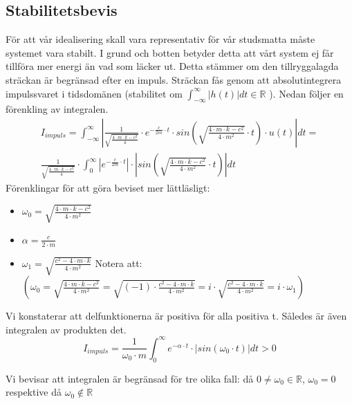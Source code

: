\documentclass[10pt,a4paper]{article}
\begin{document}
\subsection{Stabilitetsbevis}
För att vår idealisering skall vara representativ för vår studsmatta måste systemet vara stabilt. I grund och botten betyder detta att vårt system ej får tillföra mer energi än vad som läcker ut. Detta stämmer om den tillryggalagda sträckan är begränsad efter en impuls. Sträckan fås genom att absolutintegrera impulssvaret i tidsdomänen (stabilitet om $\int_{-\infty}^{\infty}|h(t)|dt\in \mathbb{R}$ ). Nedan följer en förenkling av integralen.
\begin{multline}
I_{impuls}=\int_{-\infty}^{\infty}| \frac{1}{\sqrt{\frac{4 \cdot m \cdot k - c^2}{4}} }  \cdot e^{-\frac{c}{2m} \cdot t} \cdot sin(\sqrt{\frac{4 \cdot m \cdot k - c^2}{4 \cdot m^2}} \cdot t) \cdot u(t)|dt=\\ \frac{1}{\sqrt{\frac{4 \cdot m \cdot k - c^2}{4}} }  \cdot \int_{0}^{\infty}|e^{-\frac{c}{2m} \cdot t}| \cdot |sin(\sqrt{\frac{4 \cdot m \cdot k - c^2}{4 \cdot m^2}} \cdot t)|dt
\end{multline}
Förenklingar för att göra beviset mer lättläsligt:
\begin{itemize}
\item $\omega_0=\sqrt{\frac{4 \cdot m \cdot k - c^2}{4 \cdot m^2}}$
\item $\alpha=\frac{c}{2\cdot m}$
\item $\omega_1=\sqrt{\frac{c^2-4 \cdot m \cdot k}{4 \cdot m^2}}$
\newline
\newline 
Notera att: $\left( \omega_0=\sqrt{\frac{4 \cdot m \cdot k-c^2}{4 \cdot m^2}}=\sqrt{(-1)\cdot\frac{c^2-4 \cdot m \cdot k}{4 \cdot m^2}}=i\cdot\sqrt{\frac{c^2-4 \cdot m \cdot k}{4 \cdot m^2}}=i\cdot \omega_1\right)$
\end{itemize}

Vi konstaterar att delfunktionerna är positiva för alla positiva t. Således är även integralen av produkten det.
$$I_{impuls}=\frac{1}{\omega_0 \cdot m}\int_{0}^{\infty}e^{-\alpha\cdot t}\cdot | sin(\omega_0\cdot t)|dt>0$$

Vi bevisar att integralen är begränsad för tre olika fall: då $0\neq\omega_0 \in \mathbb{R}$, $\omega_0=0$ respektive då $\omega_0 \notin \mathbb{R}$
\end{document}
